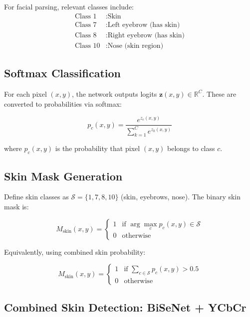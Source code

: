 \documentclass[11pt,a4paper]{article}
\newcommand{\vect}[1]{\bm{#1}}
\begin{document}
For facial parsing, relevant classes include:
\begin{align}
\text{Class 1} &: \text{Skin} \\
\text{Class 7} &: \text{Left eyebrow (has skin)} \\
\text{Class 8} &: \text{Right eyebrow (has skin)} \\
\text{Class 10} &: \text{Nose (skin region)}
\end{align}

\subsection{Softmax Classification}

For each pixel $(x, y)$, the network outputs logits $\vect{z}(x,y) \in \mathbb{R}^C$. These are converted to probabilities via softmax:

\begin{equation}
p_c(x, y) = \frac{e^{z_c(x,y)}}{\sum_{k=1}^{C} e^{z_k(x,y)}}
\end{equation}

where $p_c(x,y)$ is the probability that pixel $(x,y)$ belongs to class $c$.

\subsection{Skin Mask Generation}

Define skin classes as $\mathcal{S} = \{1, 7, 8, 10\}$ (skin, eyebrows, nose). The binary skin mask is:

\begin{equation}
M_{\text{skin}}(x, y) = \begin{cases}
1 & \text{if } \arg\max_c p_c(x,y) \in \mathcal{S} \\
0 & \text{otherwise}
\end{cases}
\end{equation}

Equivalently, using combined skin probability:

\begin{equation}
M_{\text{skin}}(x, y) = \begin{cases}
1 & \text{if } \sum_{c \in \mathcal{S}} p_c(x,y) > 0.5 \\
0 & \text{otherwise}
\end{cases}
\end{equation}

\subsection{Combined Skin Detection: BiSeNet + YCbCr}
\end{document}

